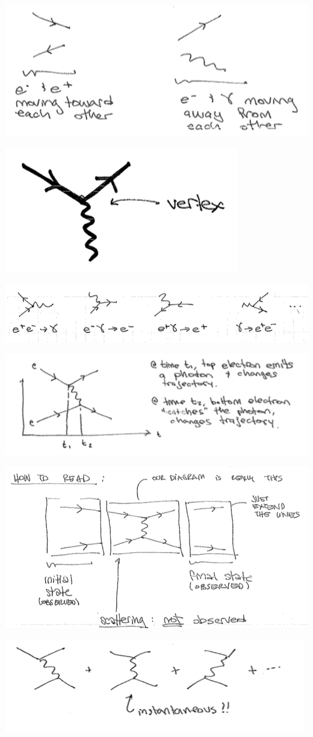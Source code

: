 \documentclass[12pt]{article}
\numberwithin{equation}{section}    %
\theoremstyle{definition}
\begin{document}
\includegraphics[width=.6\textwidth]{Lec1_noaxis}


\includegraphics[width=.3\textwidth]{Lec1_vertex}

\includegraphics[width=\textwidth]{Lec1_3pt}

\includegraphics[width=\textwidth]{Lec1_order}


\includegraphics[width=\textwidth]{Lec1_diagram}

\includegraphics[width=\textwidth]{Lec1_sum}
\end{document}
